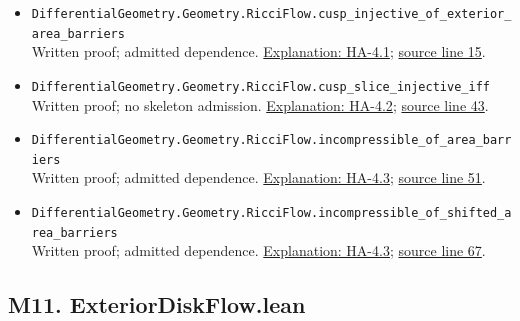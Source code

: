 \documentclass[
  letterpaper,
  11pt]{article}
\begin{document}
\begin{itemize}
\item
  {\small\texttt{Differential\allowbreak{}Geometry.\allowbreak{}Geometry.\allowbreak{}Ricci\allowbreak{}Flow.\allowbreak{}cusp\_\allowbreak{}injective\_\allowbreak{}of\_\allowbreak{}exterior\_\allowbreak{}area\_\allowbreak{}barriers}}\\
  Written proof; admitted dependence. \hyperref[ha-4-1]{Explanation:
  HA-4.1};
  \href{https://github.com/qinz1yang/differential-geometry-dev/blob/ea0fae60ee01ef8c8d9b57a51794c6538f679c5d/DifferentialGeometry/Geometry/Flow/RicciFlow/LongTime/CuspIncompressibility.lean\#L15}{source
  line 15}.
\item
  {\small\texttt{Differential\allowbreak{}Geometry.\allowbreak{}Geometry.\allowbreak{}Ricci\allowbreak{}Flow.\allowbreak{}cusp\_\allowbreak{}slice\_\allowbreak{}injective\_\allowbreak{}iff}}\\
  Written proof; no skeleton admission. \hyperref[ha-4-2]{Explanation:
  HA-4.2};
  \href{https://github.com/qinz1yang/differential-geometry-dev/blob/ea0fae60ee01ef8c8d9b57a51794c6538f679c5d/DifferentialGeometry/Geometry/Flow/RicciFlow/LongTime/CuspIncompressibility.lean\#L43}{source
  line 43}.
\item
  {\small\texttt{Differential\allowbreak{}Geometry.\allowbreak{}Geometry.\allowbreak{}Ricci\allowbreak{}Flow.\allowbreak{}incompressible\_\allowbreak{}of\_\allowbreak{}area\_\allowbreak{}barriers}}\\
  Written proof; admitted dependence. \hyperref[ha-4-3]{Explanation:
  HA-4.3};
  \href{https://github.com/qinz1yang/differential-geometry-dev/blob/ea0fae60ee01ef8c8d9b57a51794c6538f679c5d/DifferentialGeometry/Geometry/Flow/RicciFlow/LongTime/CuspIncompressibility.lean\#L51}{source
  line 51}.
\item
  {\small\texttt{Differential\allowbreak{}Geometry.\allowbreak{}Geometry.\allowbreak{}Ricci\allowbreak{}Flow.\allowbreak{}incompressible\_\allowbreak{}of\_\allowbreak{}shifted\_\allowbreak{}area\_\allowbreak{}barriers}}\\
  Written proof; admitted dependence. \hyperref[ha-4-3]{Explanation:
  HA-4.3};
  \href{https://github.com/qinz1yang/differential-geometry-dev/blob/ea0fae60ee01ef8c8d9b57a51794c6538f679c5d/DifferentialGeometry/Geometry/Flow/RicciFlow/LongTime/CuspIncompressibility.lean\#L67}{source
  line 67}.
\end{itemize}


\subsection{M11.
ExteriorDiskFlow.lean}\label{m11.-exteriordiskflow.lean}
\end{document}
